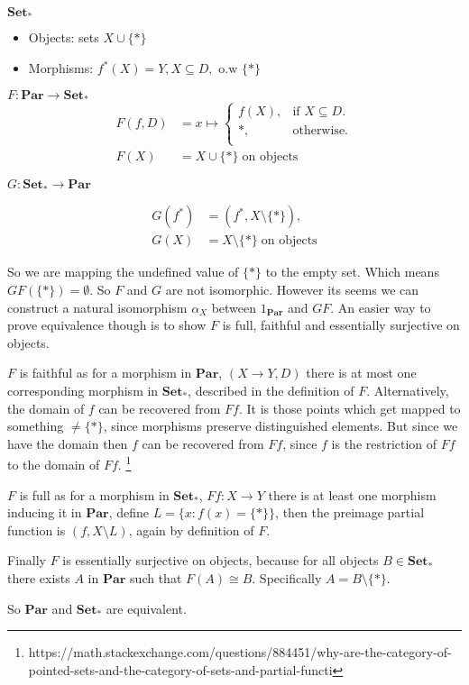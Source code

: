 \documentclass{article}
\begin{document}
$\mathbf{Set_*}$
\begin{itemize}
  \item Objects: sets $X \cup \{*\}$
  \item Morphisms: $f^*(X) = Y, X \subseteq D, \text{ o.w } \{*\}$
\end{itemize}

$F\colon \mathbf{Par} \rightarrow \mathbf{Set_*}$
\begin{align*}
  F(f, D) &= x \mapsto \begin{cases}
    f(X), & \text{if $X \subseteq D$}.\\
    {*}, & \text{otherwise}.\\
  \end{cases} \\
  F(X) &= X \cup \{*\} \; \text{on objects}
\end{align*}

$G\colon \mathbf{Set_*} \rightarrow \mathbf{Par}$

\begin{align*}
  G(f^*) &= (f^*, X \setminus \{*\}),\\
  G(X) &= X \setminus \{*\} \;\text{on objects}
\end{align*}

So we are mapping the undefined value of $\{*\}$ to the empty set. Which means
$GF(\{*\}) = \emptyset$. So $F$ and $G$ are not isomorphic. However its seems we can construct a natural isomorphism $\alpha_X$ between $1_{\mathbf{Par}}$ and $GF$. An easier way to prove equivalence though is to show $F$ is full, faithful and essentially surjective on objects.

$F$ is faithful as for a morphism in $\mathbf{Par}$, $(X \rightarrow Y, D)$  there is at most one corresponding morphism in $\mathbf{Set_*}$, described in the definition of $F$. Alternatively, the domain of $f$ can be recovered from $Ff$. It is those points which get mapped to something $\neq \{*\}$, since morphisms preserve distinguished elements. But since we have the domain then $f$ can be recovered from $Ff$, since $f$ is the restriction of $Ff$ to the domain of $Ff$. \footnote{https://math.stackexchange.com/questions/884451/why-are-the-category-of-pointed-sets-and-the-category-of-sets-and-partial-functi}

$F$ is full as for a morphism in $\mathbf{Set_*}$, $Ff \colon X \rightarrow Y$ there is at least one morphism inducing it in $\mathbf{Par}$, define $L = \{x\colon f(x) = \{*\}\}$, then the preimage partial function is $(f, X \setminus L)$, again by definition of $F$.

Finally $F$ is essentially surjective on objects, because for all objects $B \in \mathbf{Set_*}$ there exists $A$ in $\mathbf{Par}$ such that $F(A)\cong B$. Specifically $A = B \setminus \{*\}$.

So $\mathbf{Par}$ and $\mathbf{Set_*}$ are equivalent.
\end{document}
